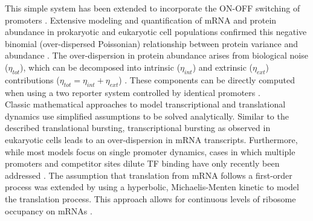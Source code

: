 \noindent This simple system has been extended to incorporate the ON-OFF switching of promoters \citep{Jones2014, Shahrezaei2008}. Extensive modeling and quantification of mRNA and protein abundance in prokaryotic and eukaryotic cell populations confirmed this negative binomial (over-dispersed Poissonian) relationship between protein variance and abundance \citep{Ozbudak2002, Bar-Even2006}. The over-dispersion in protein abundance arises from biological noise ($\eta_{tot}$), which can be decomposed into intrinsic ($\eta_{int}$) and extrinsic ($\eta_{ext}$) contributions ($\eta_{tot}=\eta_{int}+\eta_{ext}$) \citep{Swain2002, Fu2016}. These components can be directly computed when using a two reporter system controlled by identical promoters \citep{Elowitz2002}. \\
Classic mathematical approaches to model transcriptional and translational dynamics use simplified assumptions to be solved analytically. Similar to the described translational bursting, transcriptional bursting as observed in eukaryotic cells \citep{Raj2006} leads to an over-dispersion in mRNA transcripts. Furthermore, while most models focus on single promoter dynamics, cases in which multiple promoters and competitor sites dilute TF binding have only recently been addressed \citep{Das2015a}. The assumption that translation from mRNA follows a first-order process was extended by using a hyperbolic, Michaelis-Menten kinetic to model the translation process. This approach allows for continuous levels of ribosome occupancy on mRNAs \citep{VanDyken2017}. \\ 

